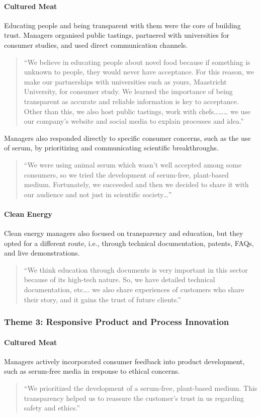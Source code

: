 \paragraph{Cultured Meat}
Educating people and being transparent with them were the core of building trust. Managers organised public tastings, partnered with universities for consumer studies, and used direct communication channels.
\begin{quote}
	“We believe in educating people about novel food because if something is unknown to people, they would never have acceptance. For this reason, we make our partnerships with universities such as yours, Maastricht University, for consumer study. We learned the importance of being transparent as accurate and reliable information is key to acceptance. Other than this, we also host public tastings, work with chefs……… we use our company’s website and social media to explain processes and idea.”
\end{quote}
Managers also responded directly to specific consumer concerns, such as the use of serum, by prioritizing and communicating scientific breakthroughs.
\begin{quote}
	“We were using animal serum which wasn’t well accepted among some consumers, so we tried the development of serum-free, plant-based medium. Fortunately, we succeeded and then we decided to share it with our audience and not just in scientific society…”
\end{quote}

\paragraph{Clean Energy}
Clean energy managers also focused on transparency and education, but they opted for a different route, i.e., through technical documentation, patents, FAQs, and live demonstrations.
\begin{quote}
	“We think education through documents is very important in this sector because of its high-tech nature. So, we have detailed technical documentation, etc…. we also share experiences of customers who share their story, and it gains the trust of future clients.”
\end{quote}

\subsubsection*{Theme 3: Responsive Product and Process Innovation}
\paragraph{Cultured Meat}
Managers actively incorporated consumer feedback into product development, such as serum-free media in response to ethical concerns.
\begin{quote}
	“We prioritized the development of a serum-free, plant-based medium. This transparency helped us to reassure the customer’s trust in us regarding safety and ethics.”
\end{quote}

